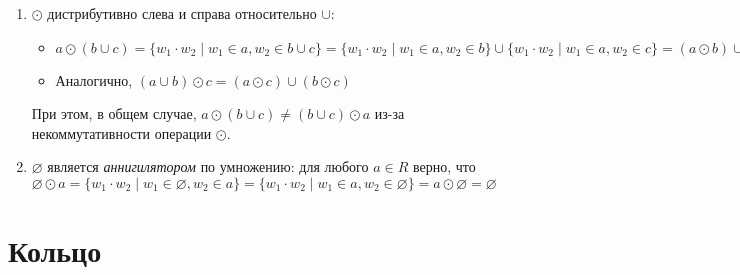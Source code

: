 \begin{example}
\begin{enumerate}
\item $\odot$ дистрибутивно слева и справа относительно $\cup$:
\begin{itemize}
	\item $a \odot (b \cup c) = \{ w_1 \cdot w_2 \mid  w_1 \in a, w_2 \in b \cup c\} = \{ w_1 \cdot w_2 \mid  w_1 \in a, w_2 \in b \} \cup  \{ w_1 \cdot w_2 \mid  w_1 \in a, w_2 \in c \} =  (a \odot b) \cup (a \odot c)$
    \item Аналогично, $(a \cup b) \odot c = (a \odot c) \cup (b \odot c)$
\end{itemize}
При этом, в общем случае, $a \odot (b \cup c) \neq (b \cup c) \odot a$ из-за некоммутативности операции $\odot$.


\item $\varnothing$ является \textit{аннигилятором} по умножению: для любого $a \in R$ верно, что
$\varnothing \odot a =  \{ w_1 \cdot w_2 \mid w_1 \in \varnothing, w_2 \in a \} =  \{ w_1 \cdot w_2 \mid w_1 \in a, w_2 \in \varnothing \} = a \odot \varnothing = \varnothing$

\end{enumerate}

\end{example}

\section{Кольцо}


